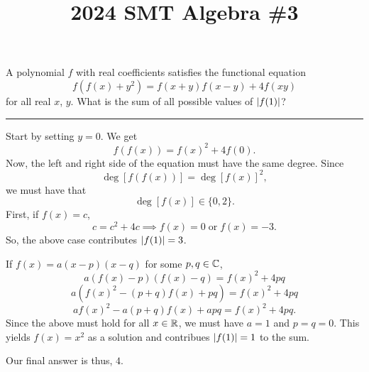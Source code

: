 \documentclass[12pt]{scrartcl}
\title{2024 SMT Algebra \#3}
\begin{document}
\begin{problem}
    A polynomial $f$ with real coefficients satisfies the functional equation
    \[f(f(x) + y^{2}) = f(x + y)f(x - y) + 4f(xy)\]
    for all real $x$, $y$. What is the sum of all possible values of $\left\lvert f(1) \right\rvert$?
\end{problem}

\vspace{-\baselineskip}\rule{\textwidth}{0.4pt}

Start by setting $y = 0$. We get
\[f(f(x)) = f(x)^{2} + 4f(0).\]
Now, the left and right side of the equation must have the same degree. Since
\[\deg[f(f(x))] = \deg[f(x)]^{2},\]
we must have that
\[\deg[f(x)] \in \{0, 2\}.\]
First, if $f(x) = c$,
\[c = c^{2} + 4c \implies f(x) = 0 \; \text{or} \; f(x) = -3.\]
So, the above case contributes $\left\lvert f(1) \right\rvert = 3$.

If $f(x) = a(x - p)(x - q)$ for some $p, q \in \mathbb C$,
\[a(f(x) - p)(f(x) - q) = f(x)^{2} + 4pq\]
\[a(f(x)^{2} - (p + q)f(x) + pq) = f(x)^{2} + 4pq\]
\[af(x)^{2} - a(p + q)f(x) + apq = f(x)^{2} + 4pq.\]
Since the above must hold for all $x \in \mathbb R$, we must have $a = 1$ and $p = q = 0$. This yields $f(x) = x^{2}$ as a solution and contribues $\left\lvert f(1) \right\rvert = 1$ to the sum.

Our final answer is thus, $\boxed{4}$.
\end{document}
